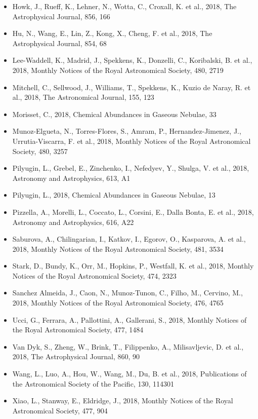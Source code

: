 \documentclass{letter}
\begin{document}
\begin{enumerate}
\begin{itemize}
\item Howk, J., Rueff, K., Lehner, N., Wotta, C., Croxall, K. et al., 2018, The Astrophysical Journal, 856, 166
\item Hu, N., Wang, E., Lin, Z., Kong, X., Cheng, F. et al., 2018, The Astrophysical Journal, 854, 68
\item Lee-Waddell, K., Madrid, J., Spekkens, K., Donzelli, C., Koribalski, B. et al., 2018, Monthly Notices of the Royal Astronomical Society, 480, 2719
\item Mitchell, C., Sellwood, J., Williams, T., Spekkens, K., Kuzio de Naray, R. et al., 2018, The Astronomical Journal, 155, 123
\item Morisset, C., 2018, Chemical Abundances in Gaseous Nebulae, 33
\item Munoz-Elgueta, N., Torres-Flores, S., Amram, P., Hernandez-Jimenez, J., Urrutia-Viscarra, F. et al., 2018, Monthly Notices of the Royal Astronomical Society, 480, 3257
\item Pilyugin, L., Grebel, E., Zinchenko, I., Nefedyev, Y., Shulga, V. et al., 2018, Astronomy and Astrophysics, 613, A1
\item Pilyugin, L., 2018, Chemical Abundances in Gaseous Nebulae, 13
\item Pizzella, A., Morelli, L., Coccato, L., Corsini, E., Dalla Bonta, E. et al., 2018, Astronomy and Astrophysics, 616, A22
\item Saburova, A., Chilingarian, I., Katkov, I., Egorov, O., Kasparova, A. et al., 2018, Monthly Notices of the Royal Astronomical Society, 481, 3534
\item Stark, D., Bundy, K., Orr, M., Hopkins, P., Westfall, K. et al., 2018, Monthly Notices of the Royal Astronomical Society, 474, 2323
\item Sanchez Almeida, J., Caon, N., Munoz-Tunon, C., Filho, M., Cervino, M., 2018, Monthly Notices of the Royal Astronomical Society, 476, 4765
\item Ucci, G., Ferrara, A., Pallottini, A., Gallerani, S., 2018, Monthly Notices of the Royal Astronomical Society, 477, 1484
\item Van Dyk, S., Zheng, W., Brink, T., Filippenko, A., Milisavljevic, D. et al., 2018, The Astrophysical Journal, 860, 90
\item Wang, L., Luo, A., Hou, W., Wang, M., Du, B. et al., 2018, Publications of the Astronomical Society of the Pacific, 130, 114301
\item Xiao, L., Stanway, E., Eldridge, J., 2018, Monthly Notices of the Royal Astronomical Society, 477, 904

\end{itemize}
\end{enumerate}
\end{document}

